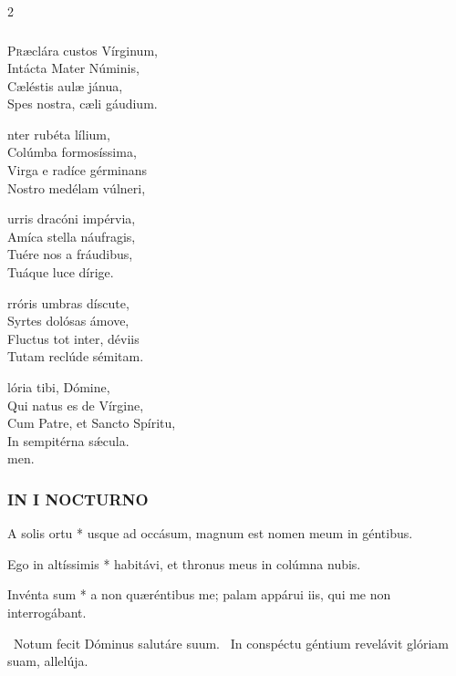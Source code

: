 \documentclass[9pt,twoside]{extarticle}
\begin{document}
\begin{multicols}{2}
\subsubsection*{\center {}}
\lettrine{P}ræclára custos Vírginum,\\
Intácta Mater Núminis,\\
Cæléstis aulæ jánua,\\
Spes nostra, cæli gáudium.

\smallskip
\noindent {}nter rubéta lílium,\\
Colúmba formosíssima,\\
Virga e radíce gérminans\\
Nostro medélam vúlneri,

\smallskip
\noindent {}urris dracóni impérvia,\\
Amíca stella náufragis,\\
Tuére nos a fráudibus,\\
Tuáque luce dírige.

\smallskip
\noindent {}rróris umbras díscute,\\
Syrtes dolósas ámove,\\
Fluctus tot inter, déviis\\
Tutam reclúde sémitam.

\smallskip
\noindent {}lória tibi, Dómine,\\
Qui natus es de Vírgine,\\
Cum Patre, et Sancto Spíritu,\\
In sempitérna sǽcula.\\
{\null \hfill {}men.}

\subsubsection*{\center \normalfont \textsc{IN I NOCTURNO}}

\smallskip
\indent {} A solis ortu * usque ad occásum, magnum est nomen meum in géntibus.

{\small {}}

 Ego in altíssimis * habitávi, et thronus meus in colúmna nubis.

 Invénta sum * a non quæréntibus me; palam appárui iis, qui me non interrogábant.

\smallskip
{}~Notum fecit Dóminus salutáre suum. ~In conspéctu géntium revelávit glóriam suam, allelúja.


\end{multicols}
\end{document}

